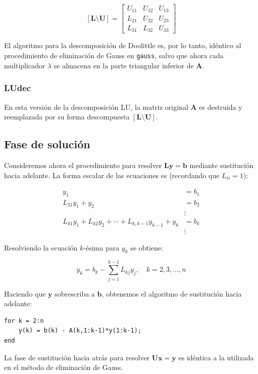 \documentclass[12pt,letterpaper]{article}
\theoremstyle{definition}
\theoremstyle{plain}
\theoremstyle{remark}
\begin{document}
\[
[\mathbf{L} \setminus \mathbf{U}] = 
\begin{bmatrix}
U_{11} & U_{12} & U_{13} \\
L_{21} & U_{22} & U_{23} \\
L_{31} & L_{32} & U_{33}
\end{bmatrix}
\tag{1.8}
\]

El algoritmo para la descomposición de Doolittle es, por lo tanto, idéntico al procedimiento de eliminación de Gauss en \texttt{gauss}, salvo que ahora cada multiplicador $\lambda$ se almacena en la parte triangular inferior de $\mathbf{A}$.

\subsubsection{LUdec}
En esta versión de la descomposición LU, la matriz original $\mathbf{A}$ es destruida y reemplazada por su forma descompuesta $[\mathbf{L} \setminus \mathbf{U}]$.



\subsection*{Fase de solución}

Consideremos ahora el procedimiento para resolver $\mathbf{Ly} = \mathbf{b}$ mediante sustitución hacia adelante. La forma escalar de las ecuaciones es (recordando que $L_{ii} = 1$):

\begin{align*}
y_1 &= b_1 \\
L_{21}y_1 + y_2 &= b_2 \\
&\vdots \\
L_{k1}y_1 + L_{k2}y_2 + \cdots + L_{k,k-1}y_{k-1} + y_k &= b_k \\
&\vdots
\end{align*}

Resolviendo la ecuación $k$-ésima para $y_k$ se obtiene:

\[
y_k = b_k - \sum_{j=1}^{k-1} L_{kj}y_j, \quad k = 2, 3, \ldots, n
\tag{1.9}
\]

Haciendo que $\mathbf{y}$ sobrescriba a $\mathbf{b}$, obtenemos el algoritmo de sustitución hacia adelante:

\begin{verbatim}
for k = 2:n
    y(k) = b(k) - A(k,1:k-1)*y(1:k-1);
end
\end{verbatim}

La fase de sustitución hacia atrás para resolver $\mathbf{Ux} = \mathbf{y}$ es idéntica a la utilizada en el método de eliminación de Gauss.
\end{document}
